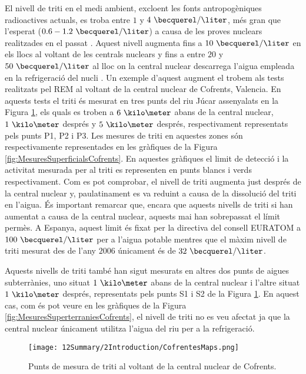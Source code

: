 El nivell de triti en el medi ambient, excloent les fonts antropogèniques radioactives actuals, es troba entre $1$ y $4~\becquerel/\liter$, més gran que l'esperat ($0.6-1.2~\becquerel/\liter$) a causa de les proves nuclears realitzades en el passat \cite{FranceTritiumEnvironment}. Aquest nivell augmenta fins a $10~\becquerel/\liter$ en els llocs al voltant de les centrals nuclears y fins a entre $20$ y $50~\becquerel/\liter$ al lloc on la central nuclear descarrega l'aigua empleada en la refrigeració del nucli \cite{FranceTritiumEnvironment}. Un exemple d'aquest augment el trobem als tests realitzats pel REM al voltant de la central nuclear de Cofrents, Valencia. En aquests tests el triti és mesurat en tres punts del riu Júcar assenyalats en la Figura \ref{fig:PuntsMesuraTritiCofrents}, els quals es troben a $6~\kilo\meter$ abans de la central nuclear, $1~\kilo\meter$ després y $5~\kilo\meter$ després, respectivament representats pels punts P1, P2 i P3. Les mesures de triti en aquestes zones són respectivamente representades en les gràfiques de la Figura \ref{fig:MesuresSuperficialsCofrents}. En aquestes gràfiques el limit de detecció i la activitat mesurada per al triti es representen en punts blancs i verds respectivament. Com es pot comprobar, el nivell de triti augmenta just després de la central nuclear y, paulatinament es va reduint a causa de la dissolució del triti en l'aigua. És important remarcar que, encara que aquests nivells de triti si han aumentat a causa de la central nuclear, aquests mai han sobrepassat el límit permès. A Espanya, aquest limit és fixat per la directiva del consell EURATOM a $100~\becquerel/\liter$ per a l'aigua potable \cite{100BqL} mentres que el màxim nivell de triti mesurat des de l'any $2006$ únicament és de $32~\becquerel/\liter$.

Aquests nivells de triti també han sigut mesurats en altres dos punts de aigues subterrànies, uno situat $1~\kilo\meter$ abans de la central nuclear i l'altre situat $1~\kilo\meter$ després, representats pels punts S1 i S2 de la Figura \ref{fig:PuntsMesuraTritiCofrents}. En aquest cas, com és pot veure en les gràfiques de la Figura \ref{fig:MesuresSuperterraniesCofrents}, el nivell de triti no es veu afectat ja que la central nuclear únicament utilitza l'aigua del riu per a la refrigeració.

\begin{figure}[hbtp]
\texttt{[image: 12Summary/2Introduction/CofrentesMaps.png]}
\centering
\caption{Punts de mesura de triti al voltant de la central nuclear de Cofrents.\label{fig:PuntsMesuraTritiCofrents}}
\end{figure}

